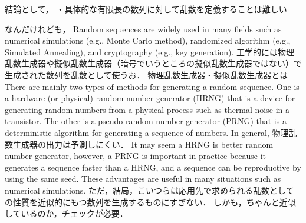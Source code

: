 結論として，
・具体的な有限長の数列に対して乱数を定義することは難しい
%
\par
なんだけれども，
Random sequences are widely used in many fields such as numerical simulations (e.g., Monte Carlo method), randomized algorithm (e.g., Simulated Annealing), and cryptography (e.g., key generation). 
工学的には物理乱数生成器や擬似乱数生成器（暗号でいうところの擬似乱数生成器ではない）で生成された数列を乱数として使うお．
物理乱数生成器・擬似乱数生成器とは
There are mainly two types of methods for generating a random sequence. One is a hardware (or physical) random number generator (HRNG) that is a device for generating random numbers from a physical process such as thermal noise in a transistor. The other is a pseudo random number generator (PRNG) that is a deterministic algorithm for generating a sequence of numbers. 
In general, 物理乱数生成器の出力は予測しにくい．
It may seem a HRNG is better random number generator, however, a PRNG is important in practice because it generates a sequence faster than a HRNG, and a sequence can be reproductive by using the same seed. These advantages are useful in many situations such as numerical simulations. 
ただ，結局，こいつらは応用先で求められる乱数としての性質を近似的にもつ数列を生成するものにすぎない．
しかも，ちゃんと近似しているのか，チェックが必要．